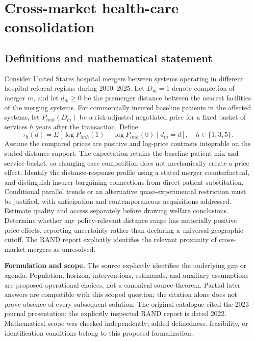 \documentclass[11pt]{article}
\begin{document}
\section*{Cross-market health-care consolidation}\label{30007722}
\subsection{Definitions and mathematical statement}
Consider United States hospital mergers between systems operating in different hospital referral regions during 2010–2025. Let \(D_m=1\) denote completion of merger \(m\), and let \(d_m\geq0\) be the premerger distance between the nearest facilities of the merging systems. For commercially insured baseline patients in the affected systems, let \(P_{imh}(D_m)\) be a risk-adjusted negotiated price for a fixed basket of services \(h\) years after the transaction. Define
\[\tau_h(d)=E[\log P_{imh}(1)-\log P_{imh}(0)\mid d_m=d],\quad h\in\{1,3,5\}.\]
Assume the compared prices are positive and log-price contrasts integrable on the stated distance support. The expectation retains the baseline patient mix and service basket, so changing case composition does not mechanically create a price effect. Identify the distance-response profile using a stated merger counterfactual, and distinguish insurer bargaining connections from direct patient substitution. Conditional parallel trends or an alternative quasi-experimental restriction must be justified, with anticipation and contemporaneous acquisitions addressed. Estimate quality and access separately before drawing welfare conclusions. Determine whether any policy-relevant distance range has materially positive price effects, reporting uncertainty rather than declaring a universal geographic cutoff. The RAND report explicitly identifies the relevant proximity of cross-market mergers as unresolved.

\par\textbf{Formulation and scope.} The source explicitly identifies the underlying gap or agenda. Population, horizon, interventions, estimands, and auxiliary assumptions are proposed operational choices, not a canonical source theorem. Partial later answers are compatible with this scoped question; the citation alone does not prove absence of every subsequent solution. The original catalogue cited the 2023 journal presentation; the explicitly inspected RAND report is dated 2022. Mathematical scope was checked independently; added definedness, feasibility, or identification conditions belong to this proposed formalization.
\end{document}
